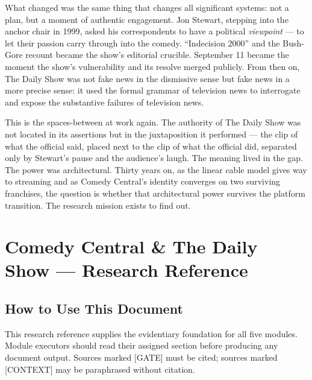 \documentclass[11pt,letterpaper]{article}
\newcommand{\stageheader}[2]{%
  \noindent\colorbox{#2}{\makebox[\textwidth][l]{%
    \textcolor{white}{\bfseries\sffamily\hspace{6pt}#1\hspace{6pt}}}}%
  \vspace{0.5em}\par%
}
\begin{document}
What changed was the same thing that changes all significant systems: not a plan, but a moment of authentic engagement. Jon Stewart, stepping into the anchor chair in 1999, asked his correspondents to have a political \emph{viewpoint} --- to let their passion carry through into the comedy. ``Indecision 2000'' and the Bush-Gore recount became the show's editorial crucible. September 11 became the moment the show's vulnerability and its resolve merged publicly. From then on, The Daily Show was not fake news in the dismissive sense but fake news in a more precise sense: it used the formal grammar of television news to interrogate and expose the substantive failures of television news.

This is the spaces-between at work again. The authority of The Daily Show was not located in its assertions but in the juxtaposition it performed --- the clip of what the official said, placed next to the clip of what the official did, separated only by Stewart's pause and the audience's laugh. The meaning lived in the gap. The power was architectural. Thirty years on, as the linear cable model gives way to streaming and as Comedy Central's identity converges on two surviving franchises, the question is whether that architectural power survives the platform transition. The research mission exists to find out.

\newpage
\stageheader{STAGE 2 --- RESEARCH REFERENCE}{secondary}

\section{Comedy Central \& The Daily Show --- Research Reference}

\subsection{How to Use This Document}

This research reference supplies the evidentiary foundation for all five modules. Module executors should read their assigned section before producing any document output. Sources marked [GATE] must be cited; sources marked [CONTEXT] may be paraphrased without citation.
\end{document}
